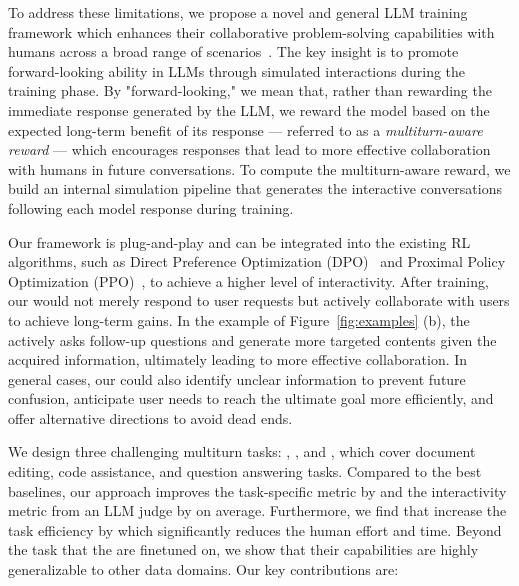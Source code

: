  To address these limitations, we propose a novel and general LLM training framework which enhances their collaborative problem-solving capabilities with humans across a broad range of scenarios~\citep{rethinking_conv_agent, neural_approach, clarify_survey}. 
The key insight is to promote forward-looking ability in LLMs through simulated interactions during the training phase. By "forward-looking," we mean that, rather than rewarding the immediate response generated by the LLM, we reward the model based on the expected long-term benefit of its response — referred to as a \textit{multiturn-aware reward} — which encourages responses that lead to more effective collaboration with humans in future conversations. To compute the multiturn-aware reward, we build an internal simulation pipeline that generates the interactive conversations following each model response during training. 

 
Our framework is plug-and-play and can be integrated into the existing RL algorithms, such as Direct Preference Optimization (DPO)~\citep{dpo} and Proximal Policy Optimization (PPO)~\citep{ppo}, to achieve a higher level of interactivity. After training, our \objects would not merely respond to user requests but actively collaborate with users to achieve long-term gains. In the example of Figure~\ref{fig:examples} (b), the \object actively asks follow-up questions and generate more targeted contents given the acquired information, ultimately leading to more effective collaboration. In general cases, our \objects could also identify unclear information to prevent future confusion, anticipate user needs to reach the ultimate goal more efficiently, and offer alternative directions to avoid dead ends. 

We design three challenging multiturn tasks: \doct, \codet, and \mathct, which cover document editing, code assistance, and question answering tasks. Compared to the best baselines, our approach improves the task-specific metric by \taskimprov and the interactivity metric from an LLM judge by \itrimprov on average. Furthermore, we find that \objects increase the task efficiency by \efficiencyimprov which significantly reduces the human effort and time. 
Beyond the task that the \objects are finetuned on, we show that their capabilities are highly generalizable to other data domains. 
Our key contributions are:

